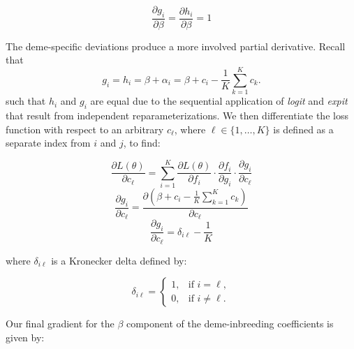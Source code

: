 \documentclass[a4paper, 12pt]{article}
\begin{document}
\begin{equation}
    \frac{\partial g_i}{\partial \beta} = \frac{\partial h_i}{\partial \beta} = 1
\end{equation}




\noindent The deme-specific deviations produce a more involved partial derivative.  Recall that
\[ g_i = h_i = \beta + \alpha_i  = \beta + c_i - \frac{1}{K} \sum_{k=1}^K c_k. \]
such that $h_i$ and $g_i$ are equal due to the sequential application of \textit{logit} and \textit{expit} that result from independent reparameterizations. We then differentiate the loss function with respect to an arbitrary $c_\ell$, where $\ell \in \{1,\dots,K\}$ is defined as a separate index from $i$ and $j$, to find:



\begin{equation}
    \label{eq_loss_figic_reparam}
    \frac{\partial L(\theta)}{\partial c_\ell} =
    \sum_{i=1}^K
    \frac{\partial L(\theta)}{\partial f_i} \cdot \frac{\partial f_i}{\partial g_i} \cdot
    \frac{\partial g_i}{\partial c_\ell}
\end{equation}
\begin{equation}
    \label{eq_loss_figic_numerator_reparam}
     \frac{\partial g_i}{\partial c_\ell}  = \frac{\partial \left(\beta + c_i -\frac{1}{K} \sum_{k=1}^K c_k\right)}{\partial c_\ell}
\end{equation}
\begin{equation}
    \label{eq_loss_figic_final_reparam}
     \frac{\partial g_i}{\partial c_\ell}  = \delta_{i \ell} - \frac{1}{K}
\end{equation}

where $\delta_{i \ell}$ is a Kronecker delta defined by:

\begin{equation}
    \label{Kronecker_delta}
\delta_{i \ell} =
    \begin{cases}
            1, &         \text{if } i=\ell,\\
            0, &         \text{if } i\neq \ell.
    \end{cases}
\end{equation}





\vspace{6mm}

\noindent Our final gradient for the $\beta$ component of the deme-inbreeding coefficients is given by:
\end{document}
